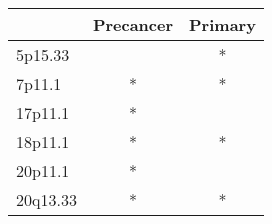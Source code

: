 \begin{tabular}{lcc}
\toprule
{} & Precancer & Primary \\
\midrule
5p15.33  &           &       * \\
7p11.1   &         * &       * \\
17p11.1  &         * &         \\
18p11.1  &         * &       * \\
20p11.1  &         * &         \\
20q13.33 &         * &       * \\
\bottomrule
\end{tabular}
